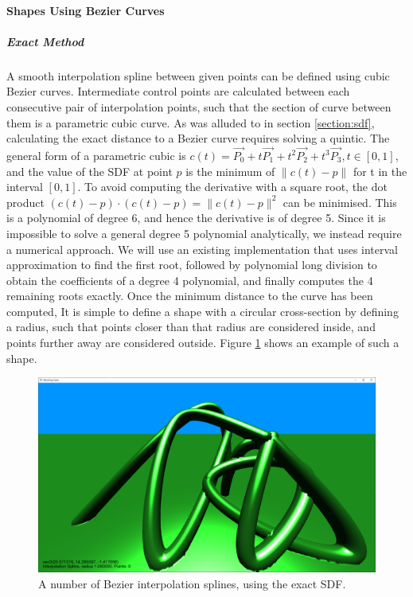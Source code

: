 \documentclass[11pt]{article}
\begin{document}
\paragraph{Shapes Using Bezier Curves}
\subparagraph{Exact Method}
A smooth interpolation spline between given points can be defined using cubic Bezier curves. Intermediate control points are calculated between each consecutive pair of interpolation points, such that the section of curve between them is a parametric cubic curve. As was alluded to in section \ref{section:sdf}, calculating the exact distance to a Bezier curve requires solving a quintic. The general form of a parametric cubic is $c\left(t\right) = \vec{P_0} + t\vec{P_1} + t^2\vec{P_2} + t^3\vec{P_3}, t \in \left[0,1\right]$, and the value of the SDF at point $p$ is the minimum of $\| c\left(t\right) -p\|$ for t in the interval $\left[0,1\right]$. To avoid computing the derivative with a square root, the dot product $\left(c\left(t\right) -p\right) \cdot \left(c\left(t\right) -p\right) = \| c\left(t\right) -p\|^2$ can be minimised. This is a polynomial of degree 6, and hence the derivative is of degree 5. 
Since it is impossible to solve a general degree 5 polynomial analytically, we instead require a numerical approach. We will use an existing implementation\cite{kraus_2021} that uses interval approximation to find the first root, followed by polynomial long division to obtain the coefficients of a degree 4 polynomial, and finally computes the 4 remaining roots exactly. Once the minimum distance to the curve has been computed, It is simple to define a shape with a circular cross-section by defining a radius, such that points closer than that radius are considered inside, and points further away are considered outside. Figure \ref{fig:exact_bezier} shows an example of such a shape.

\begin{figure}[H]
  \includegraphics[width=\textwidth]{exact_bezier}
  \caption{A number of Bezier interpolation splines, using the exact SDF.}
  \label{fig:exact_bezier}
\end{figure}
\end{document}
